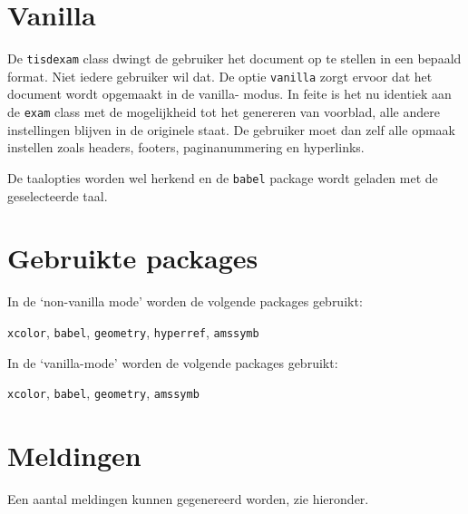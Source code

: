 \documentclass[dutch,a4paper,12pt,addpoints,fleqn,oneside]{tisdexam}
\newcommand\Package[1]{\texttt{#1}}
\newcommand\DocClass[1]{\texttt{#1}}
\newcommand\Option[1]{\texttt{#1}}
\begin{document}
\section{Vanilla}
\label{sec:vanilla}
De \DocClass{tisdexam} class dwingt de gebruiker het document op te stellen
in een bepaald format. Niet iedere gebruiker wil dat. De optie
\Option{vanilla} zorgt ervoor dat het document wordt opgemaakt in de vanilla-%
modus. In feite is het nu identiek aan de \DocClass{exam} class met de
mogelijkheid tot het genereren van voorblad, alle andere instellingen blijven
in de originele staat. De gebruiker moet dan zelf alle opmaak instellen
zoals headers, footers, paginanummering en hyperlinks.

De taalopties worden wel herkend en de \Package{babel} package wordt geladen
met de geselecteerde taal.

\section{Gebruikte packages}
In de `non-vanilla mode' worden de volgende packages gebruikt:

\texttt{xcolor}, \texttt{babel}, \texttt{geometry}, \texttt{hyperref}, \texttt{amssymb}

\medskip
In de `vanilla-mode' worden de volgende packages gebruikt:

\texttt{xcolor}, \texttt{babel}, \texttt{geometry}, \texttt{amssymb}


\section{Meldingen}
Een aantal meldingen kunnen gegenereerd worden, zie hieronder.
\end{document}
